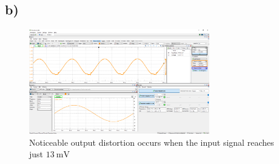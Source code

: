 \documentclass{article}
\begin{document}
	\subsection*{b)}
	
	\begin{figure}[H]
	    \centering
	    \includegraphics[width=0.7\textwidth]{w2}
	    \caption{Noticeable output distortion occurs when the input signal reaches just $\SI{13}{\mV}$}
	\end{figure}
\end{document}
